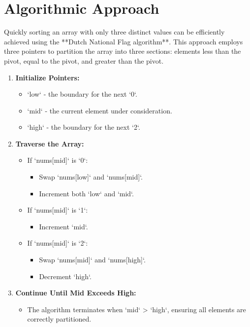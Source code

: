 \section*{Algorithmic Approach}
Quickly sorting an array with only three distinct values can be efficiently achieved using the **Dutch National Flag algorithm**. This approach employs three pointers to partition the array into three sections: elements less than the pivot, equal to the pivot, and greater than the pivot.

\begin{enumerate}
    \item \textbf{Initialize Pointers:}
    \begin{itemize}
        \item `low` - the boundary for the next `0`.
        \item `mid` - the current element under consideration.
        \item `high` - the boundary for the next `2`.
    \end{itemize}
    
    \item \textbf{Traverse the Array:}
    \begin{itemize}
        \item If `nums[mid]` is `0`:
        \begin{itemize}
            \item Swap `nums[low]` and `nums[mid]`.
            \item Increment both `low` and `mid`.
        \end{itemize}
        
        \item If `nums[mid]` is `1`:
        \begin{itemize}
            \item Increment `mid`.
        \end{itemize}
        
        \item If `nums[mid]` is `2`:
        \begin{itemize}
            \item Swap `nums[mid]` and `nums[high]`.
            \item Decrement `high`.
        \end{itemize}
    \end{itemize}
    
    \item \textbf{Continue Until Mid Exceeds High:}
    \begin{itemize}
        \item The algorithm terminates when `mid` > `high`, ensuring all elements are correctly partitioned.
    \end{itemize}
\end{enumerate}

